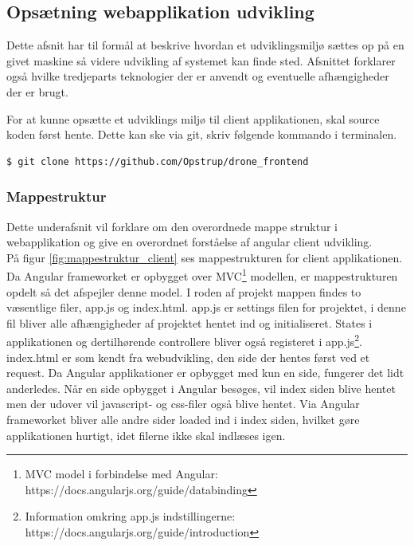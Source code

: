 \subsection{Opsætning webapplikation udvikling}
Dette afsnit har til formål at beskrive hvordan et udviklingsmiljø sættes op på en givet maskine så videre udvikling af systemet kan finde sted. Afsnittet forklarer også hvilke tredjeparts teknologier der er anvendt og eventuelle afhængigheder der er brugt.

For at kunne opsætte et udviklings miljø til client applikationen, skal source koden først hente. Dette kan ske via git, skriv følgende kommando i terminalen.

\begin{lstlisting}[language=bash]
	$ git clone https://github.com/Opstrup/drone_frontend
\end{lstlisting}

\vspace{-1cm}

\subsubsection*{Mappestruktur}
Dette underafsnit vil forklare om den overordnede mappe struktur i webapplikation og give en overordnet forståelse af angular client udvikling. \\

På figur \ref{fig:mappestruktur_client} ses mappestrukturen for client applikationen. Da Angular frameworket er opbygget over MVC\footnote{MVC model i forbindelse med Angular: https://docs.angularjs.org/guide/databinding} modellen, er mappestrukturen opdelt så det afspejler denne model. I roden af projekt mappen findes to væsentlige filer, app.js og index.html. 
app.js er settings filen for projektet, i denne fil bliver alle afhængigheder af projektet hentet ind og initialiseret. States i applikationen og dertilhørende controllere bliver også registeret i app.js\footnote{Information omkring app.js indstillingerne: https://docs.angularjs.org/guide/introduction}.\\
index.html er som kendt fra webudvikling, den side der hentes først ved et request. Da Angular applikationer er opbygget med kun en side, fungerer det lidt anderledes. Når en side opbygget i Angular besøges, vil index siden blive hentet men der udover vil javascript- og css-filer også blive hentet. Via Angular frameworket bliver alle andre sider loaded ind i index siden, hvilket gøre applikationen hurtigt, idet filerne ikke skal indlæses igen.

